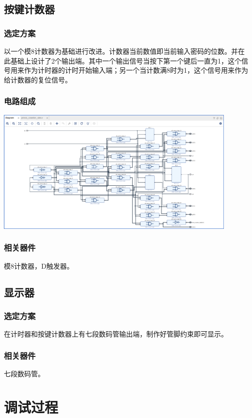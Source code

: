 \documentclass[a4paper,11pt]{ctexart}
\begin{document}
\subsection{按键计数器}
\subsubsection{选定方案}以一个模8计数器为基础进行改进。计数器当前数值即当前输入密码的位数。并在此基础上设计了2个输出端。其中一个输出信号当按下第一个键后一直为1，这个信号用来作为计时器的计时开始输入端；另一个当计数满8时为1，这个信号用来作为给计数器的复位信号。
\subsubsection{电路组成}\includegraphics[width =0.9\textwidth]{./images/pic5.eps}
\subsubsection{相关器件}模8计数器，D触发器。

\subsection{显示器}
\subsubsection{选定方案}在计时器和按键计数器上有七段数码管输出端，制作好管脚约束即可显示。
\subsubsection{相关器件}七段数码管。

\section{调试过程}
\end{document}
